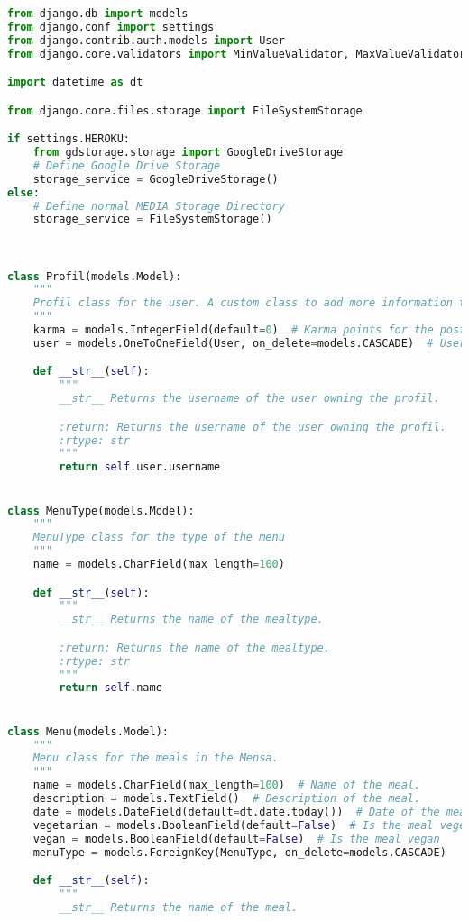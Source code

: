 \begin{lstlisting}[language=Python]
from django.db import models
from django.conf import settings
from django.contrib.auth.models import User
from django.core.validators import MinValueValidator, MaxValueValidator

import datetime as dt

from django.core.files.storage import FileSystemStorage

if settings.HEROKU:
    from gdstorage.storage import GoogleDriveStorage
    # Define Google Drive Storage
    storage_service = GoogleDriveStorage()
else:
    # Define normal MEDIA Storage Directory
    storage_service = FileSystemStorage()
    


class Profil(models.Model):
    """
    Profil class for the user. A custom class to add more information to the user.
    """
    karma = models.IntegerField(default=0)  # Karma points for the posts from the user. 
    user = models.OneToOneField(User, on_delete=models.CASCADE)  # User linked to the profil. -> The profil is deleted when the user is deleted.

    def __str__(self):
        """
        __str__ Returns the username of the user owning the profil.

        :return: Returns the username of the user owning the profil.
        :rtype: str
        """
        return self.user.username


class MenuType(models.Model):
    """
    MenuType class for the type of the menu
    """
    name = models.CharField(max_length=100)

    def __str__(self):
        """
        __str__ Returns the name of the mealtype.

        :return: Returns the name of the mealtype.
        :rtype: str
        """
        return self.name


class Menu(models.Model):
    """
    Menu class for the meals in the Mensa.
    """
    name = models.CharField(max_length=100)  # Name of the meal.
    description = models.TextField()  # Description of the meal.
    date = models.DateField(default=dt.date.today())  # Date of the meal. Default is the current date.
    vegetarian = models.BooleanField(default=False)  # Is the meal vegetarian?
    vegan = models.BooleanField(default=False)  # Is the meal vegan
    menuType = models.ForeignKey(MenuType, on_delete=models.CASCADE)

    def __str__(self):
        """
        __str__ Returns the name of the meal.


\end{lstlisting}
